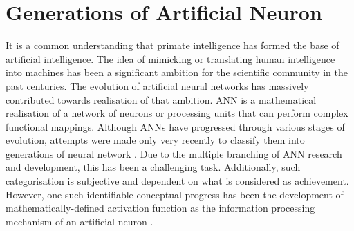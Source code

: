 \section{Generations of Artificial Neuron}
It is a common understanding that primate intelligence has formed the base of artificial intelligence. The idea of mimicking or translating human intelligence into machines has been a significant ambition for the scientific community in the past centuries. The evolution of artificial neural networks has massively contributed towards realisation of that ambition. ANN is a mathematical realisation of a network of neurons or processing units that can perform complex functional mappings. Although ANNs have progressed through various stages of evolution, attempts were made only very recently to classify them into generations of neural network \citep{maass1997networks}. Due to the multiple branching of ANN research and development, this has been a challenging task. Additionally, such categorisation is subjective and dependent on what is considered as achievement. However, one such identifiable conceptual progress has been the development of mathematically-defined activation function as the information processing mechanism of an artificial neuron \citep{maass1997networks}. 

